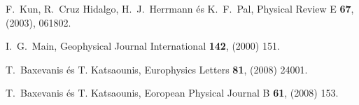\begin{thebibliography}{200}
\vspace*{-0.3cm}
 F.\ Kun, R.\ Cruz Hidalgo, H.\ J.\ Herrmann \'es K.\ F.\ Pal, Physical Review E {\bf 67}, (2003), 061802.

\vspace*{-0.3cm}
 I.\ G.\ Main, Geophysical Journal International {\bf 142}, (2000) 151.

\vspace*{-0.3cm}
 T.\ Baxevanis \'es T. Katsaounis, Europhysics Letters {\bf 81}, (2008) 24001.

\vspace*{-0.3cm}
 T.\ Baxevanis \'es T. Katsaounis, Eoropean Physical Journal B {\bf 61}, (2008) 153.

\end{thebibliography}
